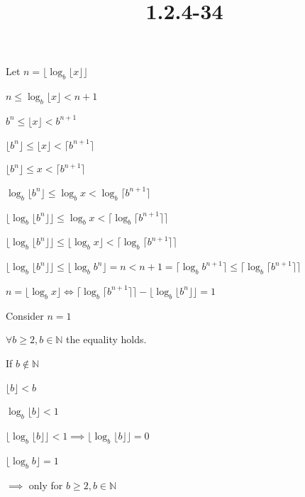 \documentclass{article}
\title{1.2.4-34}
\begin{document}
\maketitle

Let \( n = \lfloor \log_b{\lfloor x \rfloor}\rfloor \)

\( n \leq \log_b{\lfloor x \rfloor} < n + 1 \)

\( b^n \leq \lfloor x \rfloor < b^{n+1} \)

\( \lfloor b^n \rfloor \leq \lfloor x \rfloor < \lceil b^{n+1} \rceil \)

\( \lfloor b^n \rfloor \leq x < \lceil b^{n+1} \rceil \)

\( \log_b \lfloor b^n \rfloor \leq \log_b{x} < \log_b\lceil b^{n+1} \rceil \)

\( \lfloor \log_b \lfloor b^n \rfloor \rfloor \leq \log_b{x} < \lceil \log_b\lceil b^{n+1} \rceil \rceil \)

\( \lfloor \log_b \lfloor b^n \rfloor \rfloor \leq \lfloor \log_b{x} \rfloor < \lceil \log_b\lceil b^{n+1} \rceil \rceil \)

\( \lfloor \log_b \lfloor b^n \rfloor \rfloor \leq \lfloor \log_b  b^n \rfloor = n < n + 1 = \lceil \log_b b^{n+1} \rceil \leq \lceil \log_b\lceil b^{n+1} \rceil \rceil \)

\( n = \lfloor \log_b{x} \rfloor \iff \lceil \log_b\lceil b^{n+1} \rceil \rceil -\lfloor \log_b \lfloor b^n \rfloor \rfloor = 1 \)

Consider \( n = 1 \)

\( \forall b \geq 2, b \in \mathbb{N} \) the equality holds.

If \( b \notin \mathbb{N} \)

\( \lfloor b \rfloor < b \)

\( \log_b{\lfloor b \rfloor} < 1 \)

\( \lfloor\log_b{\lfloor b \rfloor}\rfloor < 1 \implies \lfloor\log_b{\lfloor b \rfloor}\rfloor = 0 \)

\( \lfloor \log_b b \rfloor = 1 \)

\( \implies \) only for \( b \geq 2, b \in \mathbb{N} \)
\end{document}
